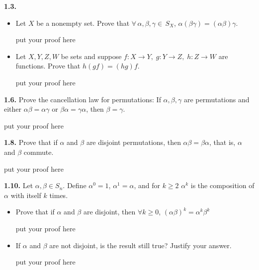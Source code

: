 \documentclass[12pt]{article}
\begin{document}
\textbf{1.3.  }
\begin{itemize}
	\item Let $X$ be a nonempty set. Prove that $\forall\, \alpha, \beta, \gamma\in \, S_X$, $\alpha(\beta\gamma)=(\alpha\beta)\gamma$.
	\bigskip
	
	put your proof here
	
	\vspace{1in}
	
	\item Let $X,Y,Z,W$ be sets and suppose $f:X\to Y,\; g:Y\to Z,\; h:Z\to W$ are functions. Prove that $h(gf)=(hg)f$.
	
		\bigskip
	
	put your proof here
	
	\vspace{1in}
	
\end{itemize}

\textbf{1.6.}  Prove the cancellation law for permutations: If $\alpha, \beta, \gamma$ are permutations and either $\alpha\beta=\alpha\gamma$ or $\beta\alpha=\gamma\alpha$, then $\beta=\gamma$.

	\bigskip
	
	put your proof here
	
	\vspace{1in}
	
\textbf{1.8.} Prove that if $\alpha$ and $\beta$ are disjoint permutations, then $\alpha\beta=\beta\alpha$, that is, $\alpha$ and $\beta$ commute.

\bigskip
	
	put your proof here
	
	\vspace{1in}
	
\textbf{1.10.} Let $\alpha, \beta\in S_n$. Define $\alpha^0=1$, $\alpha^1=\alpha$, and for $k\ge 2$ $\alpha^k$ is the composition of $\alpha$ with itself $k$ times.

\begin{itemize}
	\item Prove that if $\alpha$ and $\beta$ are disjoint, then $\forall k\ge0$, $(\alpha\beta)^k=\alpha^k\beta^k$

	\bigskip
	
	put your proof here
	
	\vspace{1in}
	
\item If $\alpha$ and $\beta$ are not disjoint, is the result still true? Justify your answer.

	\bigskip
	
	put your proof here
	
	\vspace{1in}
	
\end{itemize}
\end{document}
